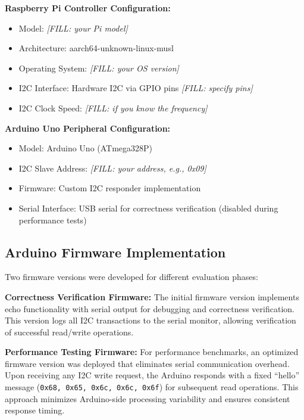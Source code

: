\textbf{Raspberry Pi Controller Configuration:}
\begin{itemize}
    \item Model: \textit{[FILL: your Pi model]}
    \item Architecture: aarch64-unknown-linux-musl
    \item Operating System: \textit{[FILL: your OS version]}
    \item I2C Interface: Hardware I2C via GPIO pins \textit{[FILL: specify pins]}
    \item I2C Clock Speed: \textit{[FILL: if you know the frequency]}
\end{itemize}

\textbf{Arduino Uno Peripheral Configuration:}
\begin{itemize}
    \item Model: Arduino Uno (ATmega328P)
    \item I2C Slave Address: \textit{[FILL: your address, e.g., 0x09]}
    \item Firmware: Custom I2C responder implementation
    \item Serial Interface: USB serial for correctness verification (disabled during performance tests)
\end{itemize}


\subsection{Arduino Firmware Implementation}
\label{subsec:arduino-firmware}

Two firmware versions were developed for different evaluation phases:

\textbf{Correctness Verification Firmware:}
The initial firmware version implements echo functionality with serial output for debugging and correctness verification. This version logs all I2C transactions to the serial monitor, allowing verification of successful read/write operations.

\textbf{Performance Testing Firmware:}
For performance benchmarks, an optimized firmware version was deployed that eliminates serial communication overhead. Upon receiving any I2C write request, the Arduino responds with a fixed ``hello'' message (\texttt{0x68, 0x65, 0x6c, 0x6c, 0x6f}) for subsequent read operations. This approach minimizes Arduino-side processing variability and ensures consistent response timing.

